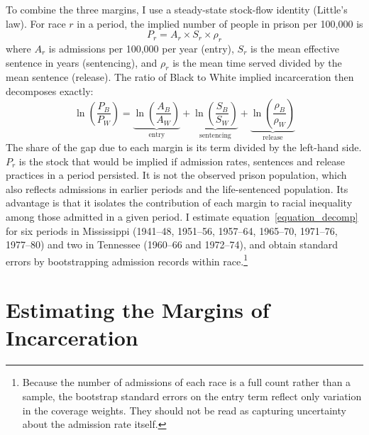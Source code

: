 \documentclass[12pt]{article}
\begin{document}
\noindent To combine the three margins, I use a steady-state stock-flow identity (Little's law).  For race $r$ in a period, the implied number of people in prison per 100,000 is
\begin{equation}
	P_{r} = A_{r} \times S_{r} \times \rho_{r}
	\label{equation_stock}
\end{equation}
where $A_{r}$ is admissions per 100,000 per year (entry), $S_{r}$ is the mean effective sentence in years (sentencing), and $\rho_{r}$ is the mean time served divided by the mean sentence (release).  The ratio of Black to White implied incarceration then decomposes exactly:
\begin{equation}
	\ln \left( \frac{P_{B}}{P_{W}} \right) = \underbrace{\ln \left( \frac{A_{B}}{A_{W}} \right)}_{\text{entry}} + \underbrace{\ln \left( \frac{S_{B}}{S_{W}} \right)}_{\text{sentencing}} + \underbrace{\ln \left( \frac{\rho_{B}}{\rho_{W}} \right)}_{\text{release}}
	\label{equation_decomp}
\end{equation}
The share of the gap due to each margin is its term divided by the left-hand side.  $P_{r}$ is the stock that would be implied if admission rates, sentences and release practices in a period persisted.  It is not the observed prison population, which also reflects admissions in earlier periods and the life-sentenced population.  Its advantage is that it isolates the contribution of each margin to racial inequality among those admitted in a given period.  I estimate equation~\ref{equation_decomp} for six periods in Mississippi (1941--48, 1951--56, 1957--64, 1965--70, 1971--76, 1977--80) and two in Tennessee (1960--66 and 1972--74), and obtain standard errors by bootstrapping admission records within race.\footnote{Because the number of admissions of each race is a full count rather than a sample, the bootstrap standard errors on the entry term reflect only variation in the coverage weights.  They should not be read as capturing uncertainty about the admission rate itself.}






\vspace*{-.1in}
\section*{Estimating the Margins of Incarceration}
\vspace*{-.1in}

\end{document}
